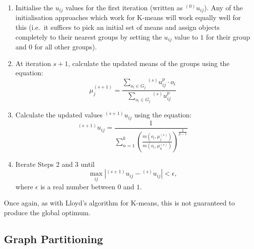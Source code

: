 \begin{enumerate}

\item Initialise the $u_{ij}$ values for the first iteration (written as ${}^{(0)}u_{ij}$). Any of the initialisation approaches which work for K-means will work equally well for this (i.e.~it suffices to pick an initial set of means and assign objects completely to their nearest groups by setting the $u_{ij}$ value to $1$ for their group and $0$ for all other groups).

\item At iteration $s+1$, calculate the updated means of the groups using the equation:
%
\[
\mu_j^{(s+1)} = \frac{\displaystyle \sum_{o_i \in G_j} {}^{(s)}u_{ij}^p \cdot o_i}{\displaystyle \sum_{o_i \in G_j} {}^{(s)}u_{ij}^p}
\]

\item Calculate the updated values ${}^{(s+1)}u_{ij}$ using the equation:
%
\[
{}^{(s+1)}u_{ij} = \frac{1}{\displaystyle \sum_{n=1}^k \left( \frac{m(o_i, \mu_j^{(s)})}{m(o_i, \mu_n^{(s)})} \right)^{\frac{2}{p-1}}}
\]

\item Iterate Steps 2 and 3 until
%
\[
\max_{ij} |{}^{(s+1)}u_{ij} - {}^{(s)}u_{ij}| < \epsilon,
\]
%
where $\epsilon$ is a real number between $0$ and $1$.

\end{enumerate}

\noindent Once again, as with Lloyd's algorithm for K-means, this is not guaranteed to produce the global optimum.

\subsection{Graph Partitioning}
\label{subsec:graphpartitioning}

